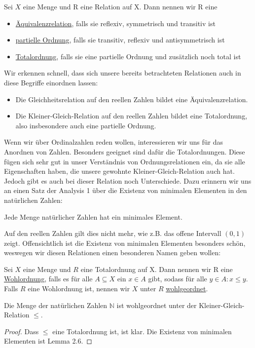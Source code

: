 \documentclass[11pt]{scrartcl}
\newcommand{\N}{\mathbb{N}}
\begin{document}
\begin{definition}
	Sei $X$ eine Menge und R eine Relation auf X. Dann nennen wir R eine 
	\begin{itemize}
		\item \underline{Äquivalenzrelation}, falls sie reflexiv, symmetrisch und transitiv ist
		\item \underline{partielle Ordnung}, falls sie transitiv, reflexiv und antisymmetrisch ist
		\item \underline{Totalordnung}, falls sie eine partielle Ordnung und zusätzlich noch total ist
	\end{itemize}
\end{definition}
\begin{example}
	Wir erkennen schnell, dass sich unsere bereits betrachteten Relationen auch in diese Begriffe einordnen lassen:	
	\begin{itemize}
		\item Die Gleichheitsrelation auf den reellen Zahlen bildet eine Äquivalenzrelation.
		\item Die Kleiner-Gleich-Relation auf den reellen Zahlen bildet eine Totalordnung, also insbesondere auch eine partielle Ordnung.
	\end{itemize}
\end{example}
Wenn wir über Ordinalzahlen reden wollen, interessieren wir uns für das Anordnen von Zahlen. Besonders geeignet sind dafür die Totalordnungen. Diese fügen sich sehr gut in unser Verständnis von Ordnungsrelationen ein, da sie alle Eigenschaften haben, die unsere gewohnte Kleiner-Gleich-Relation auch hat. \\
Jedoch gibt es auch bei dieser Relation noch Unterschiede. Dazu erinnern wir uns an einen Satz der Analysis 1 über die Existenz von minimalen Elementen in den natürlichen Zahlen:
\begin{lemma} Jede Menge natürlicher Zahlen hat ein minimales Element.
\end{lemma}
Auf den reellen Zahlen gilt dies nicht mehr, wie z.B. das offene Intervall $(0,1)$ zeigt. Offensichtlich ist die Existenz von minimalen Elementen besonders schön, weswegen wir diesen Relationen einen besonderen Namen geben wollen:
\begin{definition}
	Sei $X$ eine Menge und $R$ eine Totalordnung auf X. Dann nennen wir R eine \underline{Wohlordnung}, falls es für alle $A\subseteq X$ ein $x\in A$ gibt, sodass für alle $y\in A: x\leq y$. Falls $R$ eine Wohlordnung ist, nennen wir $X$ unter $R$ \underline{wohlgeordnet}.
\end{definition}
\begin{theorem}
	Die Menge der natürlichen Zahlen $\N$ ist wohlgeordnet unter der Kleiner-Gleich-Relation $\leq$.
\end{theorem}
\begin{proof}
	Dass $\leq$ eine Totalordnung ist, ist klar. Die Existenz von minimalen Elementen ist Lemma 2.6.
\end{proof}
\end{document}

